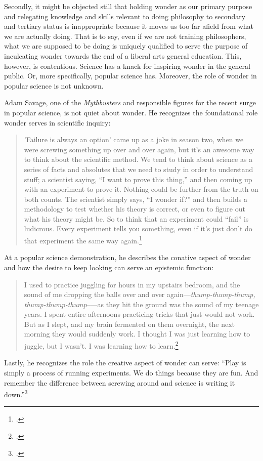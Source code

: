 \documentclass[letterpaper,notitlepage,12pt]{article}
\begin{document}
Secondly, it might be objected still that holding wonder as our primary purpose
and relegating knowledge and skills relevant to doing philosophy to secondary
and tertiary status is inappropriate because it moves us too far afield from
what we are actually doing.
That is to say, even if we are not training philosophers, what we are supposed
to be doing is uniquely qualified to serve the purpose of inculcating wonder
towards the end of a liberal arts general education.
This, however, is contentious.
Science has a knack for inspiring wonder in the general public.
Or, more specifically, popular science has.
Moreover, the role of wonder in popular science is not unknown.

Adam Savage, one of the \textit{Mythbusters} and responsible figures for the
recent surge in popular science, is not quiet about wonder.
He recognizes the foundational role wonder serves in scientific inquiry:
\begin{quotation}
  'Failure is always an option' came up as a joke in season two, when we were
  screwing something up over and over again, but it’s an awesome way to think
  about the scientific method. We tend to think about science as a series of
  facts and absolutes that we need to study in order to understand stuff; a
  scientist saying, “I want to prove this thing,” and then coming up with an
  experiment to prove it. Nothing could be further from the truth on both
  counts. The scientist simply says, “I wonder if?” and then builds a
  methodology to test whether his theory is correct, or even to figure out what
  his theory might be. So to think that an experiment could “fail” is ludicrous.
  Every experiment tells you something, even if it’s just don’t do that
  experiment the same way again.\footcite{lahey_mythbusters_2014}
\end{quotation}
At a popular science demonstration, he describes the conative aspect of wonder
and how the desire to keep looking can serve an epistemic function:
\begin{quotation}
  I used to practice juggling for hours in my upstairs bedroom, and the sound of
  me dropping the balls over and over again---\textit{thump-thump-thump,
  thump-thump-thump}--—as they hit the ground was the sound of my teenage years.
  I spent entire afternoons practicing tricks that just would not work. But as I
  slept, and my brain fermented on them overnight, the next morning they would
  suddenly work. I thought I was just learning how to juggle, but I wasn't. I
  was learning how to learn.\footcite{lahey_mythbusters_2014}
\end{quotation}
Lastly, he recognizes the role the creative aspect of wonder can serve: ``Play
is simply a process of running experiments. We do things because they are fun.
And remember the difference between screwing around and science is writing it
down.''\footcite{lahey_mythbusters_2014}
\end{document}
